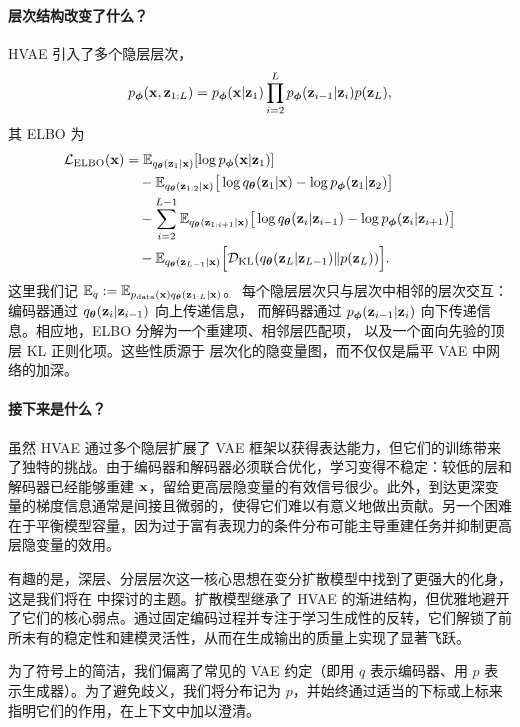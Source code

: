 \paragraph{层次结构改变了什么？}
HVAE 引入了多个隐层层次，
\[
p_{\bm{\phi}}({\mathbf{x}},{\mathbf{z}}_{1:L})=p_{\bm{\phi}}({\mathbf{x}}|{\mathbf{z}}_1)\prod_{i=2}^L p_{\bm{\phi}}({\mathbf{z}}_{i-1}|{\mathbf{z}}_i) p({\mathbf{z}}_L),
\]
其 ELBO 为
\begin{align*}
\mathcal L_{\mathrm{ELBO}}({\mathbf{x}})
&= \mathbb{E}_{q_{\bm{\theta}}({\mathbf{z}}_1|{\mathbf{x}})}[\log p_{\bm{\phi}}({\mathbf{x}}|{\mathbf{z}}_1)]
\\
&\quad - \mathbb{E}_{q_{\bm{\theta}}({\mathbf{z}}_{1:2}|{\mathbf{x}})}
\big[\log q_{\bm{\theta}}({\mathbf{z}}_1|{\mathbf{x}})-\log p_{\bm{\phi}}({\mathbf{z}}_1|{\mathbf{z}}_2)\big]
\\
&\quad - \sum_{i=2}^{L-1}
\mathbb{E}_{q_{\bm{\theta}}({\mathbf{z}}_{1:i+1}|{\mathbf{x}})}
\big[\log q_{\bm{\theta}}({\mathbf{z}}_i|{\mathbf{z}}_{i-1})-\log p_{\bm{\phi}}({\mathbf{z}}_i|{\mathbf{z}}_{i+1})\big]
\\
&\quad - \mathbb{E}_{q_{\bm{\theta}}({\mathbf{z}}_{L-1}|{\mathbf{x}})}
\Big[\mathcal{D}_{\mathrm{KL}}(q_{\bm{\theta}}({\mathbf{z}}_L|{\mathbf{z}}_{L-1}) \| p({\mathbf{z}}_L))\Big].
\end{align*}
这里我们记 $\mathbb{E}_q := \mathbb{E}_{p_{\mathrm{data}}({\mathbf{x}}) q_{{\bm{\theta}}}({\mathbf{z}}_{1:L}|{\mathbf{x}})}$。
每个隐层层次只与层次中相邻的层次交互：
编码器通过 $q_{\bm{\theta}}({\mathbf{z}}_i|{\mathbf{z}}_{i-1})$ 向上传递信息，
而解码器通过 $p_{\bm{\phi}}({\mathbf{z}}_{i-1}|{\mathbf{z}}_i)$ 向下传递信息。相应地，ELBO
分解为一个重建项、相邻层匹配项，
以及一个面向先验的顶层 KL 正则化项。这些性质源于
层次化的隐变量图，而不仅仅是扁平 VAE 中网络的加深。

\paragraph{接下来是什么？}
虽然 HVAE 通过多个隐层扩展了 VAE 框架以获得表达能力，但它们的训练带来了独特的挑战。由于编码器和解码器必须联合优化，学习变得不稳定：较低的层和解码器已经能够重建 ${\mathbf{x}}$，留给更高层隐变量的有效信号很少。此外，到达更深变量的梯度信息通常是间接且微弱的，使得它们难以有意义地做出贡献。另一个困难在于平衡模型容量，因为过于富有表现力的条件分布可能主导重建任务并抑制更高层隐变量的效用。


有趣的是，深层、分层层次这一核心思想在变分扩散模型中找到了更强大的化身，这是我们将在  中探讨的主题。扩散模型继承了 HVAE 的渐进结构，但优雅地避开了它们的核心弱点。通过固定编码过程并专注于学习生成性的反转，它们解锁了前所未有的稳定性和建模灵活性，从而在生成输出的质量上实现了显著飞跃。

为了符号上的简洁，我们偏离了常见的 VAE 约定（即用 $q$ 表示编码器、用 $p$ 表示生成器）。为了避免歧义，我们将分布记为
$p$，并始终通过适当的下标或上标来指明它们的作用，在上下文中加以澄清。


